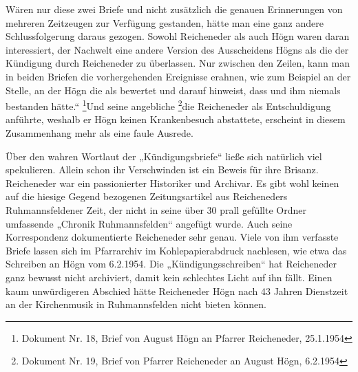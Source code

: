 Wären nur diese zwei Briefe und nicht zusätzlich die genauen
Erinnerungen von mehreren Zeitzeugen zur Verfügung gestanden, hätte man
eine ganz andere Schlussfolgerung daraus gezogen. Sowohl Reicheneder
als auch Högn waren daran interessiert, der Nachwelt eine andere
Version des Ausscheidens Högns als die der Kündigung durch Reicheneder
zu überlassen. Nur zwischen den Zeilen, kann man in beiden Briefen die
vorhergehenden Ereignisse erahnen, wie zum Beispiel an der Stelle, an
der Högn die  als  bewertet und darauf hinweist, dass
und ihm niemals
bestanden hätte.“  \footnote{Dokument Nr. 18, Brief von August Högn an
Pfarrer Reicheneder, 25.1.1954}\zitat{ }Und seine angebliche
 \footnote{Dokument Nr. 19, Brief
von Pfarrer Reicheneder an August Högn, 6.2.1954}\zitat{ }die
Reicheneder als Entschuldigung anführte, weshalb er Högn keinen
Krankenbesuch abstattete, erscheint in diesem Zusammenhang mehr als
eine faule Ausrede.

Über den wahren Wortlaut der „Kündigungsbriefe“ ließe sich natürlich
viel spekulieren. Allein schon ihr Verschwinden ist ein Beweis für ihre
Brisanz. Reicheneder war ein passionierter Historiker und Archivar. Es
gibt wohl keinen auf die hiesige Gegend bezogenen Zeitungsartikel aus
Reicheneders Ruhmannsfeldener Zeit, der nicht in seine über 30 prall
gefüllte Ordner umfassende „Chronik Ruhmannsfelden“ angefügt wurde.
Auch seine Korrespondenz dokumentierte Reicheneder sehr genau. Viele
von ihm verfasste Briefe lassen sich im Pfarrarchiv im
Kohlepapierabdruck nachlesen, wie etwa das Schreiben an Högn vom
6.2.1954. Die „Kündigungsschreiben“ hat Reicheneder ganz bewusst nicht
archiviert, damit kein schlechtes Licht auf ihn fällt. Einen kaum
unwürdigeren Abschied hätte Reicheneder Högn nach 43 Jahren Dienstzeit
an der Kirchenmusik in Ruhmannsfelden nicht bieten können.

